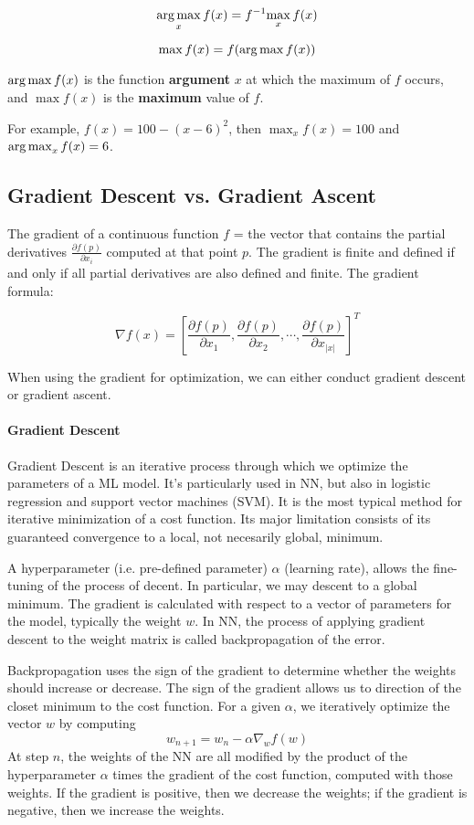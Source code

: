 \documentclass[sutton_barto_notes.tex]{subfiles}
\begin{document}
$$ \operatorname*{arg\,max}_x f(x) = f^{-1} { \max_x f(x) } $$

$$ \max f(x) = f( \operatorname*{arg\,max} f(x) ) $$

$\operatorname*{arg\,max} f(x)$ is the function \textbf{argument} $x$ at which the maximum of $f$ occurs, and $\max f(x)$ is the \textbf{maximum} value of $f$.

For example, $f(x) = 100 - (x-6)^2$, then $\max_x f(x) = 100$ and $\operatorname*{arg\,max}_x f(x) = 6$.


\subsection{Gradient Descent vs. Gradient Ascent}

The gradient of a continuous function $f$ = the vector that contains the partial derivatives $\frac{\partial f(p)}{\partial x_i}$ computed at that point $p$.
The gradient is finite and defined if and only if all partial derivatives are also defined and finite.
The gradient formula:

$$ \nabla f(x) = [\frac{\partial f(p)}{\partial x_1}, \frac{\partial f(p)}{\partial x_2}, \cdots, \frac{\partial f(p)}{\partial x_{|x|}}]^T $$

When using the gradient for optimization, we can either conduct gradient descent or gradient ascent.

\paragraph{Gradient Descent}
Gradient Descent is an iterative process through which we optimize the parameters of a ML model. It's particularly used in NN, but also in logistic regression and support vector machines (SVM). It is the most typical method for iterative minimization of a cost function. Its major limitation consists of its guaranteed convergence to a local, not necesarily global, minimum.

A hyperparameter (i.e. pre-defined parameter) $\alpha$ (learning rate), allows the fine-tuning of the process of decent. In particular, we may descent to a global minimum.
The gradient is calculated with respect to a vector of parameters for the model, typically the weight $w$. In NN, the process of applying gradient descent to the weight matrix is called backpropagation of the error.

Backpropagation uses the sign of the gradient to determine whether the weights should increase or decrease. The sign of the gradient allows us to direction of the closet minimum to the cost function. For a given $\alpha$, we iteratively optimize the vector $w$ by computing
$$ w_{n+1} = w_n - \alpha \nabla_w f(w) $$
At step $n$, the weights of the NN are all modified by the product of the hyperparameter $\alpha$ times the gradient of the cost function, computed with those weights.
If the gradient is positive, then we decrease the weights; if the gradient is negative, then we increase the weights.
\end{document}
